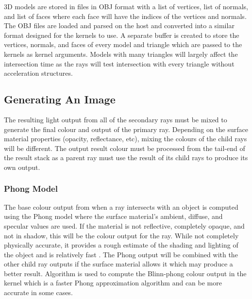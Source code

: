 \documentclass[final]{cmpreport}
\begin{document}
3D models are stored in files in OBJ format with a list of vertices, list of normals, and list of faces where each face will have the indices of the vertices and normals. The OBJ files are loaded and parsed on the host and converted into a similar format designed for the kernels to use. A separate buffer is created to store the vertices, normals, and faces of every model and triangle which are passed to the kernels as kernel arguments. Models with many triangles will largely affect the intersection time as the rays will test intersection with every triangle without acceleration structures.

\subsection{Generating An Image}

The resulting light output from all of the secondary rays must be mixed to generate the final colour and output of the primary ray. Depending on the surface material properties (opacity, reflectance, etc), mixing the colours of the child rays will be different. The output result colour must be processed from the tail-end of the result stack as a parent ray must use the result of its child rays to produce its own output.

\subsubsection{Phong Model}

The base colour output from when a ray intersects with an object is computed using the Phong model where the surface material's ambient, diffuse, and specular values are used. If the material is not reflective, completely opaque, and not in shadow, this will be the colour output for the ray. While not completely physically accurate, it provides a rough estimate of the shading and lighting of the object and is relatively fast \citep{bishop1986fast}. The Phong output will be combined with the other child ray outputs if the surface material allows it which may produce a better result. Algorithm  is used to compute the Blinn-phong colour output in the kernel \citep{blinn1977models} which is a faster Phong approximation algorithm and can be more accurate in some cases. \citep{shading}
\end{document}
